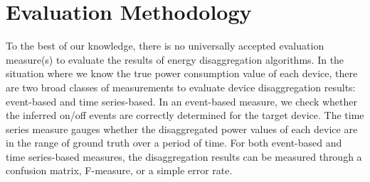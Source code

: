 \section{Evaluation Methodology}
\label{sec:evaluation}
To the best of our knowledge, there is no universally
accepted evaluation measure(s)
to evaluate the 
results of energy disaggregation algorithms.
In the situation where we know the true power consumption value of each device, there are two broad classes of measurements to evaluate 
device disaggregation results: event-based and time 
series-based. In an event-based measure, we check whether the 
inferred on/off events are correctly determined 
for the target device. 
The time series measure gauges whether the disaggregated 
power values of each device 
are in the range of ground truth over a period of time. 
For both event-based and time series-based measures, 
the disaggregation results can be measured through a confusion matrix, 
F-measure, or a simple error rate. 
 



